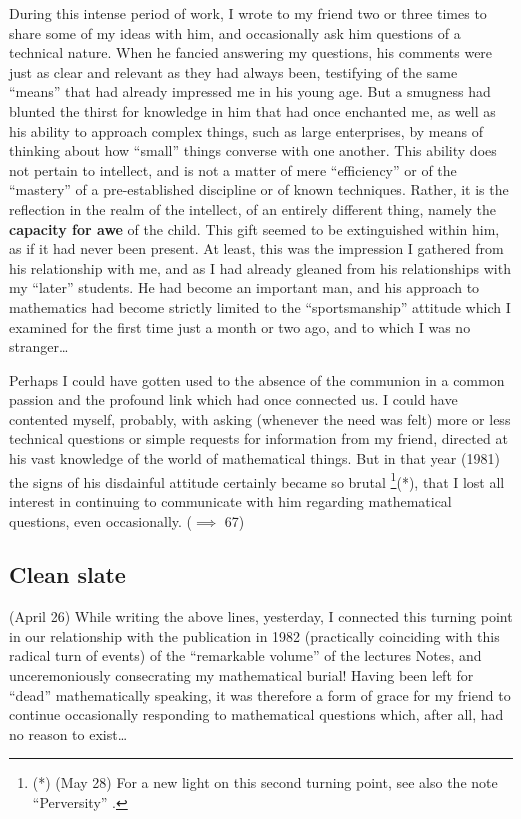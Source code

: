 During this intense period of work, I wrote to my friend two or three times to share
some of my ideas with him, and occasionally ask him questions of a technical nature.
When he fancied answering my questions, his comments were just as clear and relevant as
they had always been, testifying of the same ``means'' that had already impressed me in
his young age. But a smugness had blunted the thirst for knowledge in him that had once
enchanted me, as well as his ability to approach complex things, such as large
enterprises, by means of thinking about how ``small'' things converse with one another.
This ability does not pertain to intellect, and is not a matter of
mere ``efficiency'' or of the ``mastery'' of a pre-established discipline or of known
techniques. Rather, it is the reflection in the realm of the intellect, of an entirely
different thing, namely the \textbf{capacity for awe} of the child. 
This gift seemed to be extinguished within him, as if it had never been present. At least,
this was the impression I gathered from his relationship with me, 
and as I had already gleaned from his relationships with my ``later'' students.
He had become an important man, and his approach to mathematics had become strictly
limited to the ``sportsmanship'' attitude which I examined for the first time just a month
or two ago, and to which I was no stranger\ldots

Perhaps I could have gotten used to the absence of the communion
in a common passion and the profound link which had once connected us.
I could have contented myself, probably, with asking (whenever the need was felt) more or
less technical questions or simple requests for information from my friend, directed at
his vast knowledge of the world of mathematical things. 
But in that year (1981) the signs of his disdainful attitude certainly became so brutal
\footnote{(*) (May 28) For a new light on this second turning point, see also the note
``Perversity'' .}(*), 
that I lost all interest in 
continuing to communicate with him regarding mathematical questions, even occasionally. 
($\implies$ 67)

\subsection{Clean slate}

 (April 26) While writing the above lines, yesterday, I connected this turning
point in our relationship with the publication in 1982 (practically coinciding with this
radical turn of events) 
of the ``remarkable volume'' of the lectures Notes, 
and unceremoniously consecrating my mathematical burial!
Having been left for ``dead'' mathematically speaking, it was therefore a form of grace
for my friend to continue occasionally responding to mathematical questions which, after
all, had no reason to exist\ldots

